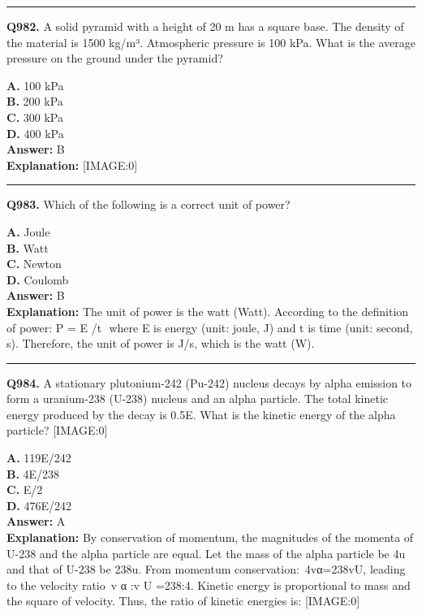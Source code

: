 \documentclass[12pt]{article}
\begin{document}
\hrule
\vspace{1em}


\noindent
\textbf{Q982.} A solid pyramid with a height of 20 m has a square base. The density of the material is 1500 kg/m³. Atmospheric pressure is 100 kPa. What is the average pressure on the ground under the pyramid?



\textbf{A.} 100 kPa \\
\textbf{B.} 200 kPa \\
\textbf{C.} 300 kPa \\
\textbf{D.} 400 kPa \\

\textbf{Answer:} B \\
\textbf{Explanation:} [IMAGE:0]

\hrule
\vspace{1em}


\noindent
\textbf{Q983.} Which of the following is a correct unit of power?



\textbf{A.} Joule \\
\textbf{B.} Watt \\
\textbf{C.} Newton \\
\textbf{D.} Coulomb \\

\textbf{Answer:} B \\
\textbf{Explanation:} The unit of power is the watt (Watt). According to the definition of power:
P
=
E
/t
​
where
E
is energy (unit: joule, J) and
t
is time (unit: second, s). Therefore, the unit of power is J/s, which is the watt (W).

\hrule
\vspace{1em}


\noindent
\textbf{Q984.} A stationary plutonium-242 (Pu-242) nucleus decays by alpha emission to form a uranium-238 (U-238) nucleus and an alpha particle. The total kinetic energy produced by the decay is 0.5E.
What is the kinetic energy of the alpha particle?
[IMAGE:0]



\textbf{A.} 119E/242 \\
\textbf{B.} 4E/238 \\
\textbf{C.} E/2 \\
\textbf{D.} 476E/242 \\

\textbf{Answer:} A \\
\textbf{Explanation:} By conservation of momentum, the magnitudes of the momenta of U-238 and the alpha particle are equal. Let the mass of the alpha particle be 4u and that of U-238 be 238u.
From momentum conservation: 4vα=238vU, leading to the velocity ratio v
α
:v
U
=238:4. Kinetic energy is proportional to mass and the square of velocity. Thus, the ratio of kinetic energies is:
[IMAGE:0]
\end{document}
